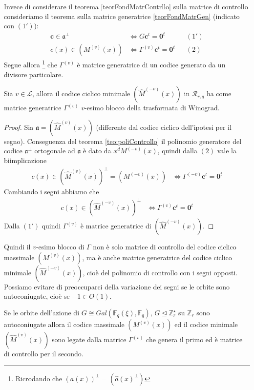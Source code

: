 Invece di considerare il teorema \ref{teorFondMatrContrllo} sulla matrice di controllo consideriamo 
il teorema sulla matrice generatrice \ref{teorFondMatrGen} (indicato con $(1')$):
\begin{align*}
   \mathbf{c} \in \mathfrak{a}^{\perp} &\iff G \mathbf{c}^{t} = \mathbf{0}^{t} & & (1') \\
   c(x) \in (M^{(v)}(x)) &\iff \Gamma^{(v)} \mathbf{c}^{t} = \mathbf{0}^{t}  & & (2)  
\end{align*} 
Segue allora \footnote{Ricrodando che $(a(x))^{\perp} = (\hat{a}(x)^{\perp})$} che $\Gamma^{(v)}$ è matrice generatrice di un codice generato da un divisore particolare.
\begin{teorema}
   Sia $v \in \mathscr{L}$, allora il codice ciclico minimale $(\hat{M}^{(-v)}(x))$ in $\mathcal{R}_{r,q}$ ha come matrice generatrice $\Gamma^{(v)} $ $v$-esimo blocco della trasformata di Winograd.
\end{teorema}
\begin{proof}
   Sia $\mathfrak{a} = (\hat{M}^{(v)}(x))$ (differente dal codice ciclico dell'ipotesi per il segno). Conseguenza del teorema \ref{teo:poliControllo} il polinomio generatore del codice $\mathfrak{a}^{\perp}$ ortogonale ad $\mathfrak{a}$ è dato da $x^{d} M^{(-v)}(x)$, quindi dalla $(2)$ vale la biimplicazione
   \begin{align*}
      c(x) \in (\hat{M}^{(v)}(x))^{\perp} = ( M^{(-v)}(x))  
      &\iff 
      \Gamma^{(-v)} \mathbf{c}^{t} = \mathbf{0}^{t}
   \end{align*}
   Cambiando i segni abbiamo che 
   \begin{align*}
      c(x) \in (\hat{M}^{(-v)}(x))^{\perp}  
      &\iff 
      \Gamma^{(v)} \mathbf{c}^{t} = \mathbf{0}^{t}
   \end{align*}
  Dalla $(1')$ quindi  $\Gamma^{(v)}$ è matrice generatrice di $(\hat{M}^{(-v)}(x))$.
\end{proof}
Quindi il $v$-esimo blocco di $\Gamma$ non è solo matrice di controllo del codice ciclico massimale $(M^{(v)}(x))$, ma è anche matrice generatrice del codice ciclico minimale $(\hat{M}^{(-v)}(x))$, cioè del polinomio di controllo con i segni opposti. Possiamo evitare di preoccuparci della variazione dei segni se le orbite sono autoconiugate, cioè se $-1 \in O(1)$. 
\begin{corollario}
   Se le orbite dell'azione di $G \cong Gal(\mathbb{F}_{q}(\xi),\mathbb{F}_{q})$, $G \trianglelefteq \mathbb{Z}_{r}^{\star} $ su $\mathbb{Z}_{r}$ sono autoconiugate allora il codice massimale $(M^{(v)}(x))$ ed il codice minimale $(\hat{M}^{(v)}(x))$ sono legate dalla matrice $\Gamma^{(v)}$ che genera il primo ed è matrice di controllo per il secondo.
\end{corollario}
